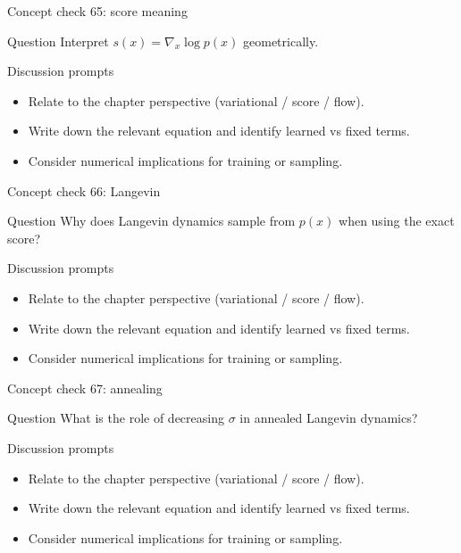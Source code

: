 \documentclass[aspectratio=169]{beamer}
\begin{document}
\begin{frame}{Concept check 65: score meaning}
\begin{block}{Question}
Interpret \(s(x)=\nabla_x\log p(x)\) geometrically.
\end{block}
\begin{block}{Discussion prompts}
\begin{itemize}
\item Relate to the chapter perspective (variational / score / flow).
\item Write down the relevant equation and identify learned vs fixed terms.
\item Consider numerical implications for training or sampling.
\end{itemize}
\end{block}
\end{frame}

\begin{frame}{Concept check 66: Langevin}
\begin{block}{Question}
Why does Langevin dynamics sample from \(p(x)\) when using the exact score?
\end{block}
\begin{block}{Discussion prompts}
\begin{itemize}
\item Relate to the chapter perspective (variational / score / flow).
\item Write down the relevant equation and identify learned vs fixed terms.
\item Consider numerical implications for training or sampling.
\end{itemize}
\end{block}
\end{frame}

\begin{frame}{Concept check 67: annealing}
\begin{block}{Question}
What is the role of decreasing \(\sigma\) in annealed Langevin dynamics?
\end{block}
\begin{block}{Discussion prompts}
\begin{itemize}
\item Relate to the chapter perspective (variational / score / flow).
\item Write down the relevant equation and identify learned vs fixed terms.
\item Consider numerical implications for training or sampling.
\end{itemize}
\end{block}
\end{frame}
\end{document}
